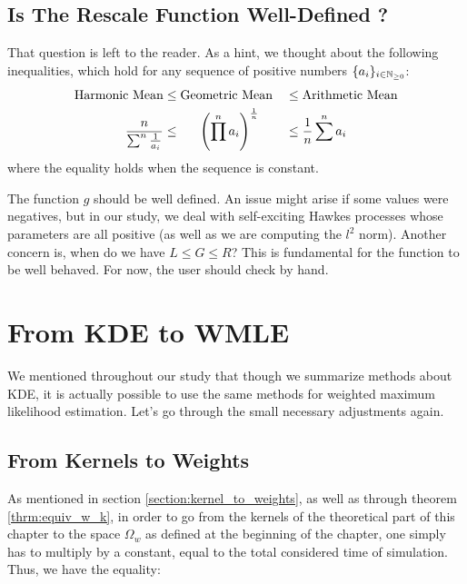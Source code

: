 \documentclass[11pt]{book}
\newcommand{\sequence}[1]{\{ #1 \}_{ i \in \N} }
\begin{document}
\subsection{Is The Rescale Function Well-Defined ?}



That question is left to the reader. As a hint, we thought about the following inequalities, which hold for any sequence of positive numbers $\sequence{a_i}$:
\begin{alignat}{2}
\text{Harmonic Mean} 
&\leq \text{Geometric Mean} 
&& \leq \text{Arithmetic Mean} \notag \\
\frac n {\sum^n \frac 1 {a_i} } 
& \leq \hspace{0.55 cm} \left ( \prod^n a_i \right ) ^{ \frac 1 n } 
&& \leq \frac 1 n \sum^n a_i \notag
\end{alignat}
where the equality holds when the sequence is constant.

The function $g$ should be well defined. An issue might arise if some values were negatives, but in our study, we deal with self-exciting Hawkes processes whose parameters are all positive (as well as we are computing the $l^2$ norm). Another concern is, when do we have $L \leq G \leq R$? This is fundamental for the function to be well behaved. For now, the user should check by hand.





















\section{From KDE to WMLE}

We mentioned throughout our study that though we summarize methods about KDE, it is actually possible to use the same methods for weighted maximum likelihood estimation. Let's go through the small necessary adjustments again.

\subsection{From Kernels to Weights}
As mentioned in section \ref{section:kernel_to_weights}, as well as through theorem \ref{thrm:equiv_w_k}, in order to go from the kernels of the theoretical part of this chapter to the space $\Omega_w$ as defined at the beginning of the chapter, one simply has to multiply by a constant, equal to the total considered time of simulation. Thus, we have the equality:
\end{document}
